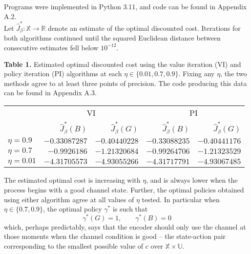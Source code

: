 \documentclass[10pt]{article}
\newcommand{\mbb}[1]{\mathbb{#1}}
\newcommand{\1}[1]{\mathbbm{1}_{#1}}
\begin{document}
    Programs were implemented in Python 3.11, and code can be found in Appendix A.2.\\[5pt]
    Let $\hat{J}^\ast_\beta:\mbb{X}\rightarrow\mbb{R}$ denote an estimate of the optimal discounted cost.
    Iterations for both algorithms continued until the squared Euclidean distance between consecutive estimates fell below $10^{-12}$.
    \begin{center}
        \begin{minipage}{\dimexpr\paperwidth-5cm}
            {\bf Table 1.} Estimated optimal discounted cost using the value iteration (VI) and policy iteration (PI) algorithms at each $\eta\in\{0.01, 0.7, 0.9\}$. Fixing any $\eta$, the two
            methods agree to at least three points of precision. The code producing this data can be found in Appendix A.3.
        \end{minipage}
    \end{center}
    \begin{center}
        \begin{tabular}{@{}l|rrrr@{}}\toprule
                & \multicolumn{2}{c}{VI} & \multicolumn{2}{c}{PI}\\
            \cmidrule(lr){2-3}\cmidrule(lr){4-5}
                & $\hat{J}^\ast_\beta(B)$ & $\hat{J}^\ast_\beta(G)$ & $\hat{J}^\ast_\beta(B)$ & $\hat{J}^\ast_\beta(G)$ \\\midrule
            $\eta=0.9$ & $-0.33087287$ & $-0.40440228$ & $-0.33088235$ & $-0.40441176$\\ 
            $\eta=0.7$ & $-0.9926186$ & $-1.21320684$ & $-0.99264706$ & $-1.21323529$\\
            $\eta=0.01$ & $-4.31705573$ & $-4.93055266$ & $-4.31717791$ & $-4.93067485$\\
            \bottomrule
        \end{tabular}
    \end{center}
    The estimated optimal cost is increasing with $\eta$, and is always lower when the process begins with a good channel state. Further, the optimal policies obtained using either algorithm agree at all values of $\eta$ tested. In particular when $\eta\in\{0.7,0.9\}$, the optimal policy $\gamma^\ast$ is such that
    \[\gamma^\ast(G)=1,\qquad\gamma^\ast(B)=0\]
    which, perhaps predictably, says that the encoder should only use the channel at those moments when the channel condition is good -- the state-action pair corresponding to the smallest possible value of $c$ over $\mbb{X}\times\mbb{U}$.\\[5pt]
\end{document}
